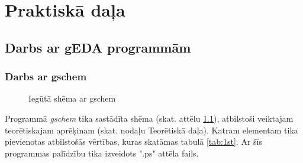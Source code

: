 \documentclass {report}
\begin{document}
\chapter{Praktiskā daļa}
\section{Darbs ar gEDA programmām}
\subsection{Darbs ar gschem}
    \begin{figure}[!h]
        \centering
        \caption{Iegūtā shēma ar gschem}
        \label{fig:1st}
    \end{figure}
\indent Programmā \textit{gschem} tika sastādīta shēma (skat. attēlu \ref{fig:1st}), atbilstoši veiktajam teorētiskajam aprēķinam (skat. nodaļu Teorētiskā daļa). Katram elementam tika pievienotas atbilstošās vērtības, kuras skatāmas tabulā \ref{tab:1st}. Ar šīs programmas palīdzību tika izveidots ".ps" attēla fails.
\pagebreak
\end{document}
